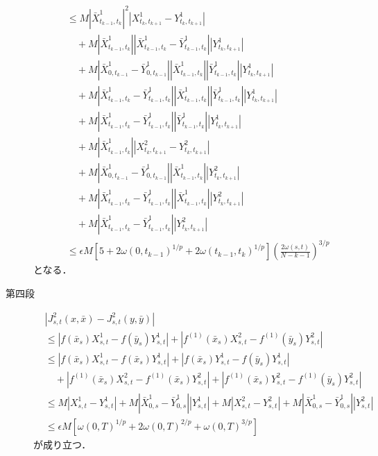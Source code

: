 \begin{prf}
\begin{description}
\begin{align}
					&\leq M \left| \bar{X}^1_{t_{k-1},t_k} \right|^2 \left| X^1_{t_k,t_{k+1}} - Y^1_{t_k,t_{k+1}} \right| \\
						&\quad + M \left| \bar{X}^1_{t_{k-1},t_k} \right| \left|\bar{X}^1_{t_{k-1},t_k} - \bar{Y}^1_{t_{k-1},t_k}\right| \left| Y^1_{t_k,t_{k+1}} \right| \\
						&\quad + M \left| \bar{X}^1_{0,t_{k-1}} - \bar{Y}^1_{0,t_{k-1}} \right| \left| \bar{X}^1_{t_{k-1},t_k} \right| \left| \bar{Y}^1_{t_{k-1},t_k} \right| \left| Y^1_{t_k,t_{k+1}} \right| \\
						&\quad + M \left| \bar{X}^1_{t_{k-1},t_k} - \bar{Y}^1_{t_{k-1},t_k} \right| \left| \bar{X}^1_{t_{k-1},t_k} \right| \left| \bar{Y}^1_{t_{k-1},t_k} \right| \left| Y^1_{t_k,t_{k+1}} \right| \\
						&\quad + M \left| \bar{X}^1_{t_{k-1},t_k} - \bar{Y}^1_{t_{k-1},t_k} \right| \left| \bar{Y}^1_{t_{k-1},t_k} \right| \left| Y^1_{t_k,t_{k+1}} \right| \\
						&\quad + M \left| \bar{X}^1_{t_{k-1},t_k} \right| \left| X^2_{t_k,t_{k+1}} - Y^2_{t_k,t_{k+1}} \right| \\
						&\quad + M \left| \bar{X}^1_{0,t_{k-1}} - \bar{Y}^1_{0,t_{k-1}} \right| \left| \bar{X}^1_{t_{k-1},t_k} \right| \left| Y^2_{t_k,t_{k+1}} \right| \\
						&\quad + M \left| \bar{X}^1_{t_{k-1},t_k} - \bar{Y}^1_{t_{k-1},t_k} \right| \left| \bar{X}^1_{t_{k-1},t_k} \right| \left| Y^2_{t_k,t_{k+1}} \right| \\
						&\quad + M \left| \bar{X}^1_{t_{k-1},t_k} - \bar{Y}^1_{t_{k-1},t_k} \right| \left| Y^2_{t_k,t_{k+1}} \right| \\
					&\leq \epsilon M \left[ 5 + 2\omega(0,t_{k-1})^{1/p} + 2\omega(t_{k-1},t_k)^{1/p} \right] \left( \frac{2\omega(s,t)}{N-k-1} \right)^{3/p}
				\end{align}
				となる．
				
			\item[第四段]
				\begin{align}
					&\left| J^2_{s,t}(x,\bar{x}) - J^2_{s,t}(y,\bar{y}) \right| \\
					&\leq \left| f(\bar{x}_s) X^1_{s,t} - f(\bar{y}_s) Y^1_{s,t} \right| + \left| f^{(1)}(\bar{x}_s) X^2_{s,t} - f^{(1)}(\bar{y}_s) Y^2_{s,t} \right| \\
					&\leq \left| f(\bar{x}_s) X^1_{s,t} - f(\bar{x}_s) Y^1_{s,t} \right| + \left| f(\bar{x}_s) Y^1_{s,t} - f(\bar{y}_s) Y^1_{s,t} \right| \\
						&\quad + \left| f^{(1)}(\bar{x}_s) X^2_{s,t} - f^{(1)}(\bar{x}_s) Y^2_{s,t} \right| + \left| f^{(1)}(\bar{x}_s) Y^2_{s,t} - f^{(1)}(\bar{y}_s) Y^2_{s,t} \right| \\
					&\leq M \left| X^1_{s,t} - Y^1_{s,t} \right| + M \left| \bar{X}^1_{0,s} - \bar{Y}^1_{0,s} \right| \left| Y^1_{s,t} \right|
						+ M \left| X^2_{s,t} - Y^2_{s,t} \right| + M \left| \bar{X}^1_{0,s} - \bar{Y}^1_{0,s} \right| \left| Y^2_{s,t} \right| \\
					&\leq \epsilon M \left[ \omega(0,T)^{1/p} + 2\omega(0,T)^{2/p} + \omega(0,T)^{3/p} \right]
				\end{align}
				が成り立つ．
				

\end{description}
\end{prf}
